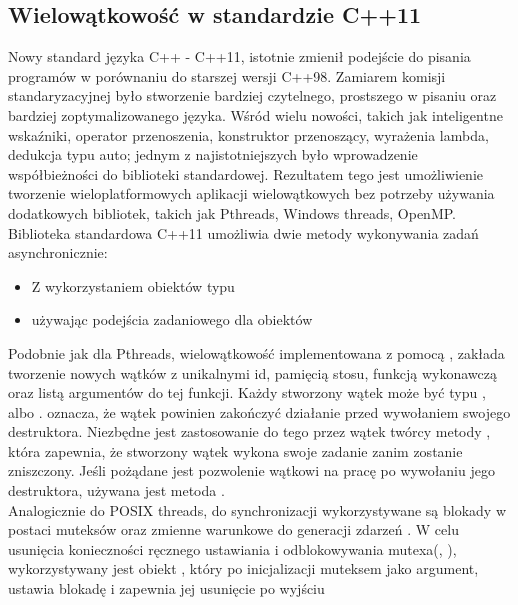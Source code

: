 \documentclass[document.tex]{subfiles}
\begin{document}
\subsection{Wielowątkowość w standardzie C++11}
\indent Nowy standard języka C++ - C++11, istotnie zmienił podejście do pisania programów w porównaniu do starszej wersji C++98. Zamiarem komisji standaryzacyjnej było stworzenie bardziej czytelnego, prostszego w pisaniu oraz bardziej zoptymalizowanego języka.
Wśród wielu nowości, takich jak inteligentne wskaźniki, operator przenoszenia, konstruktor przenoszący, wyrażenia lambda, dedukcja typu auto; jednym z najistotniejszych było wprowadzenie współbieżności do biblioteki standardowej.
Rezultatem tego jest umożliwienie tworzenie wieloplatformowych aplikacji 
wielowątkowych bez potrzeby używania dodatkowych bibliotek, takich jak Pthreads,
Windows threads, OpenMP.\cite{C++_Meyers}\cite{C++_Stroustrup}
\\
\indent Biblioteka standardowa C++11 umożliwia dwie metody wykonywania
zadań asynchronicznie\cite{C++_Meyers}\cite{C++11_iso}:
\begin{itemize}
\item Z wykorzystaniem obiektów typu 
\item używając podejścia zadaniowego dla obiektów 
\end{itemize}
\indent Podobnie jak dla Pthreads, wielowątkowość implementowana z pomocą
, zakłada tworzenie nowych wątków z unikalnymi id, 
pamięcią stosu, funkcją wykonawczą oraz listą argumentów do tej funkcji.
Każdy stworzony wątek może być typu , albo .
 oznacza, że wątek powinien zakończyć działanie przed
wywołaniem swojego destruktora. Niezbędne jest zastosowanie do tego 
przez wątek twórcy metody , która zapewnia, że stworzony
wątek wykona swoje zadanie zanim zostanie zniszczony. Jeśli pożądane
jest pozwolenie wątkowi na pracę po wywołaniu jego destruktora, 
używana jest metoda .\cite{C++11_iso}\cite{C++_Stroustrup}
\\
\indent Analogicznie do POSIX threads, do synchronizacji wykorzystywane są blokady w postaci muteksów   oraz zmienne warunkowe do generacji zdarzeń 
. W celu usunięcia konieczności ręcznego
ustawiania i odblokowywania mutexa(, ),
wykorzystywany jest obiekt , który po inicjalizacji
muteksem jako argument, ustawia blokadę i zapewnia jej usunięcie po wyjściu
\end{document}

